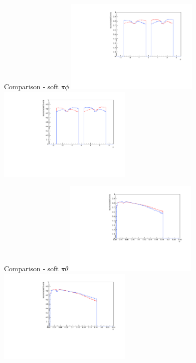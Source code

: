 \documentclass[11pt]{beamer}
\begin{document}
\begin{frame}{Comparison - soft $\pi \phi$}
\centering
\includegraphics[width=0.48\textwidth]{fourth/up_pdf/combined/h_phi_reco_SPi.pdf}
\includegraphics[width=0.48\textwidth]{fourth/down_pdf/combined/h_phi_reco_SPi.pdf}
\end{frame}
\begin{frame}{Comparison - soft $\pi \theta$}
\centering
\includegraphics[width=0.48\textwidth]{fourth/up_pdf/combined/h_theta_reco_SPi.pdf}
\includegraphics[width=0.48\textwidth]{fourth/down_pdf/combined/h_theta_reco_SPi.pdf}
\end{frame}
\end{document}
